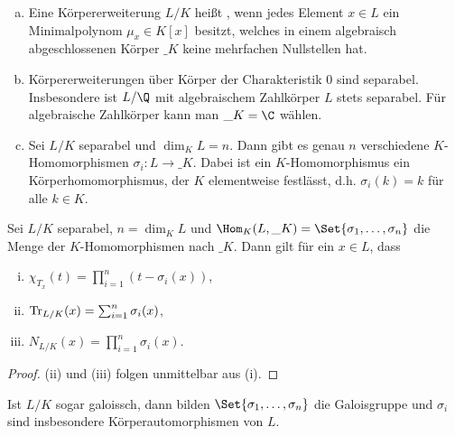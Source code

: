 \begin{nt} \label{8.4}
	\begin{enumerate}[a)]
		\item
			Eine Körpererweiterung $L / K$ heißt , wenn jedes Element $x \in L$ ein Minimalpolynom $\mu_x \in K[x]$ besitzt, welches in einem algebraisch abgeschlossenen Körper $\_K$ keine mehrfachen Nullstellen hat.
		\item
			Körpererweiterungen über Körper der Charakteristik 0 sind separabel.
			Insbesondere ist $L / \Q$ mit algebraischem Zahlkörper $L$ stets separabel.
			Für algebraische Zahlkörper kann man $\_K = \C$ wählen.
		\item
			Sei $L / K$ separabel und $\dim_K L = n$.
			Dann gibt es genau $n$ verschiedene $K$-Homomorphismen $\sigma_i: L \to \_K$.
			Dabei ist ein $K$-Homomorphismus ein Körperhomomorphismus, der $K$ elementweise festlässt, d.h. $\sigma_i(k) = k$ für alle $k \in K$.
	\end{enumerate}
\end{nt}

\begin{st} \label{8.5}
	Sei $L / K$ separabel, $n = \dim_K L$ und $\Hom_K(L, \_K) = \Set{\sigma_1, \dotsc, \sigma_n}$ die Menge der $K$-Homomorphismen nach $\_K$.
	Dann gilt für ein $x \in L$, dass
	\begin{enumerate}[(i)]
		\item
			$\chi_{T_x}(t) = \prod_{i=1}^n (t - \sigma_i(x))$,
		\item
			$\operatorname{Tr}_{L/K}(x) = \sum_{i=1}^n \sigma_i(x)$,
		\item
			$N_{L/K}(x) = \prod_{i=1}^n \sigma_i(x)$.
	\end{enumerate}
	\begin{proof}
		(ii) und (iii) folgen unmittelbar aus (i).
	\end{proof}
	\begin{note}
		Ist $L / K$ sogar galoissch, dann bilden $\Set{\sigma_1, \dotsc, \sigma_n}$ die Galoisgruppe und $\sigma_i$ sind insbesondere Körperautomorphismen von $L$.
	\end{note}
\end{st}


